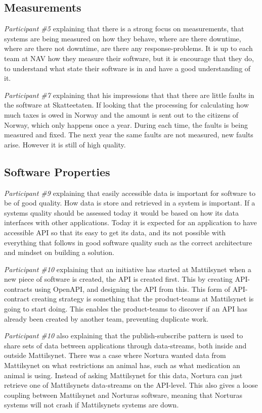 \subsection{Measurements}
\textit{Participant \#5} explaining that there is a strong focus on measurements, that systems are being measured on how they behave, where are there downtime, where are there not downtime, are there any response-problems. It is up to each team at NAV how they measure their software, but it is encourage that they do, to understand what state their software is in and have a good understanding of it.

\textit{Participant \#7} explaining that his impressions that that there are little faults in the software at Skatteetaten. If looking that the processing for calculating how much taxes is owed in Norway and the amount is sent out to the citizens of Norway, which only happens once a year. During each time, the faults is being measured and fixed. The next year the same faults are not measured, new faults arise. However it is still of high quality.

\subsection{Software Properties}
\textit{Participant \#9} explaining that easily accessible data is important for software to be of good quality. How data is store and retrieved in a system is important. If a systems quality should be assessed today it would be based on how its data interfaces with other applications. Today it is expected for an application to have accessible API so that its easy to get its data, and its not possible with everything that follows in good software quality such as the correct architecture and mindset on building a solution.

\textit{Participant \#10} explaining that an initiative has started at Mattilsynet when a new piece of software is created, the API is created first. This by creating API-contracts using OpenAPI, and designing the API from this. This form of API-contract creating strategy is something that the product-teams at Mattilsynet is going to start doing. This enables the product-teams to discover if an API has already been created by another team, preventing duplicate work.

\textit{Participant \#10} also explaining that the publish-subscribe pattern is used to share sets of data between applications through data-streams, both inside and outside Mattilsynet. There was a case where Nortura wanted data from Mattilsynet on what restrictions an animal has, such as what medication an animal is using. Instead of asking Mattilsynet for this data, Nortura can just retrieve one of Mattilsynets data-streams on the API-level. This also gives a loose coupling between Mattilsynet and Norturas software, meaning that Norturas systems will not crash if Mattilsynets systems are down.

